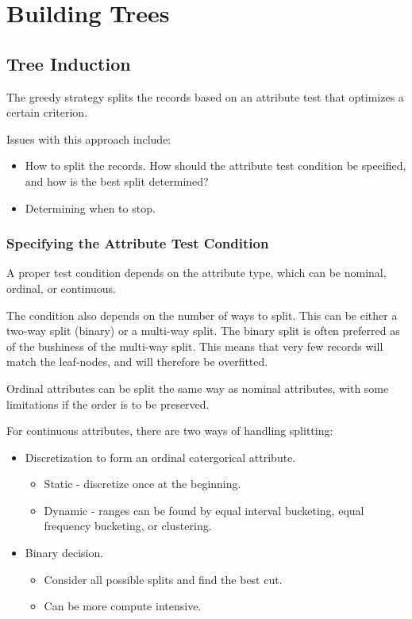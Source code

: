 \section{Building Trees}
\subsection{Tree Induction}

The greedy strategy splits the records based on an attribute test that optimizes a certain criterion.

Issues with this approach include:
\begin{itemize}
    \item How to split the records. How should the attribute test condition be specified, and how is the best split determined?
    \item Determining when to stop.
\end{itemize}

\subsubsection{Specifying the Attribute Test Condition}
A proper test condition depends on the attribute type, which can be nominal, ordinal, or continuous.
\medskip

The condition also depends on the number of ways to split. This can be either a two-way split (binary) or a multi-way split. The binary split is often preferred as of the bushiness of the multi-way split. This means that very few records will match the leaf-nodes, and will therefore be overfitted.
\medskip

Ordinal attributes can be split the same way as nominal attributes, with some limitations if the order is to be preserved.
\medskip

For continuous attributes, there are two ways of handling splitting:
\begin{itemize}
    \item Discretization to form an ordinal catergorical attribute.
    \begin{itemize}
        \item Static - discretize once at the beginning.
        \item Dynamic - ranges can be found by equal interval bucketing, equal frequency bucketing, or clustering.
    \end{itemize}
    \item Binary decision.
    \begin{itemize}
        \item Consider all possible splits and find the best cut.
        \item Can be more compute intensive.
    \end{itemize}
\end{itemize}

